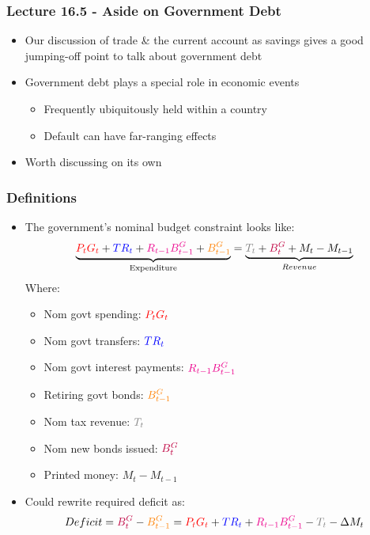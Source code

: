 \documentclass{beamer}
\date{}
\author{Trevor Gallen}
\begin{document}
\renewcommand*{\inserttotalframenumber}{\pageref{lastframe}}

\begin{frame}
\titlepage
\end{frame}

\begin{frame}
\frametitle{Lecture 16.5 - Aside on Government Debt}
\begin{itemize}
\item Our discussion of trade \& the current account as savings gives a good jumping-off point to talk about government debt
\bigskip
\item Government debt plays a special role in economic events
\bigskip
\begin{itemize}
\item Frequently ubiquitously held within a country
\bigskip
\item Default can have far-ranging effects
\end{itemize}
\item Worth discussing on its own
\end{itemize}
\end{frame}


\begin{frame}
\frametitle{Definitions}
\begin{itemize}
\item The government's nominal budget constraint looks like:
$$\underbrace{\textcolor{red}{P_tG_t}+\textcolor{blue}{TR_t}+\textcolor{magenta}{R_{t-1}B_{t-1}^G}+\textcolor{orange}{B_{t-1}^G}}_{\text{Expenditure}}=\underbrace{\textcolor{gray}{T_t}+\textcolor{purple}{B_t^G}+M_t-M_{t-1}}_{Revenue}$$
Where:
\begin{itemize}
\item Nom govt spending: $\textcolor{red}{P_tG_t}$
\item Nom govt transfers: $\textcolor{blue}{TR_t}$
\item Nom govt interest payments: $\textcolor{magenta}{R_{t-1}B_{t-1}^G}$
\item Retiring govt bonds: $\textcolor{orange}{B_{t-1}^G}$
\item Nom tax revenue: $\textcolor{gray}{T_t}$
\item Nom new bonds issued: $\textcolor{purple}{B_t^G}$
\item Printed money: $M_t-M_{t-1}$
\end{itemize}
\item Could rewrite required deficit as:
$$Deficit=\textcolor{purple}{B_t^G}-\textcolor{orange}{B_{t-1}^G}=\textcolor{red}{P_tG_t}+\textcolor{blue}{TR_t}+\textcolor{magenta}{R_{t-1}B_{t-1}^G}-\textcolor{gray}{T_t}-\Delta M_t$$
\end{itemize}
\end{frame}
\end{document}
